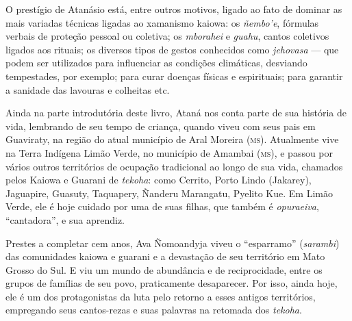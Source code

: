 O prestígio de Atanásio está, entre outros motivos, ligado ao fato de
dominar as mais variadas técnicas ligadas ao xamanismo kaiowa: os
\textit{ñembo'e}, fórmulas verbais de proteção pessoal ou coletiva; os
\textit{mborahei} e \textit{guahu}, cantos coletivos ligados aos rituais; os
diversos tipos de gestos conhecidos como \textit{jehovasa} --- que podem ser
utilizados para influenciar as condições climáticas, desviando
tempestades, por exemplo; para curar doenças físicas e espirituais; para
garantir a sanidade das lavouras e colheitas etc.

Ainda na parte introdutória deste livro, Ataná nos conta
parte de sua história de vida, lembrando de seu tempo de criança, quando
viveu com seus pais em Guaviraty, na região do atual município de Aral
Moreira (\textsc{ms}). Atualmente vive na Terra Indígena Limão Verde, no
município de Amambai (\textsc{ms}), e passou por vários outros territórios de ocupação tradicional ao longo de sua vida, chamados pelos
Kaiowa e Guarani de \textit{tekoha}: como Cerrito, Porto Lindo (Jakarey),
Jaguapire, Guasuty, Taquapery, Ñanderu Marangatu, Pyelito Kue. Em Limão
Verde, ele é hoje cuidado por uma de suas filhas, que também é
\textit{opuraeiva}, ``cantadora'', e sua aprendiz.

Prestes a completar cem anos, Ava Ñomoandyja viveu o ``esparramo''
(\textit{sarambi}) das comunidades kaiowa e guarani e a devastação de seu
território em Mato Grosso do Sul. E viu um mundo de abundância e de
reciprocidade, entre os grupos de famílias de seu povo, praticamente
desaparecer. Por isso, ainda hoje, ele é um dos protagonistas da luta
pelo retorno a esses antigos territórios, empregando seus cantos-rezas e
suas palavras na retomada dos \textit{tekoha}.

